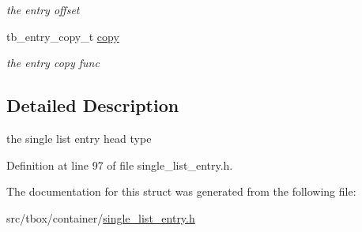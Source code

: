 \begin{DoxyCompactItemize}
\begin{DoxyCompactList}\small\item\em the entry offset \end{DoxyCompactList}\item 
\hypertarget{structtb__single__list__entry__head__t_a5c15eb977f1b6435cdffd81cd8ffe0bc}{tb\-\_\-entry\-\_\-copy\-\_\-t \hyperlink{structtb__single__list__entry__head__t_a5c15eb977f1b6435cdffd81cd8ffe0bc}{copy}}\label{structtb__single__list__entry__head__t_a5c15eb977f1b6435cdffd81cd8ffe0bc}

\begin{DoxyCompactList}\small\item\em the entry copy func \end{DoxyCompactList}\end{DoxyCompactItemize}


\subsection{Detailed Description}
the single list entry head type 

Definition at line 97 of file single\-\_\-list\-\_\-entry.\-h.



The documentation for this struct was generated from the following file\-:\begin{DoxyCompactItemize}
\item 
src/tbox/container/\hyperlink{single__list__entry_8h}{single\-\_\-list\-\_\-entry.\-h}\end{DoxyCompactItemize}
